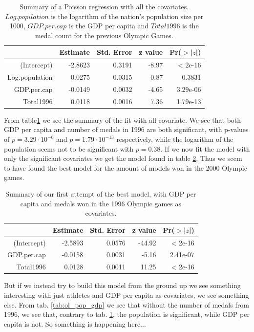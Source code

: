 \documentclass[a4paper,norsk, 10pt]{article}
\begin{document}
\begin{table}[!htb]
\centering
\begin{tabular}{rrrrr}
  \hline
 & Estimate & Std. Error & z value & Pr($>$|$z$|) \\ 
  \hline
(Intercept) & -2.8623 & 0.3191 & -8.97 & < 2e-16 \\ 
  Log.population & 0.0275 & 0.0315 & 0.87 & 0.3831 \\ 
  GDP.per.cap & -0.0149 & 0.0032 & -4.65 & 3.29e-06 \\ 
  Total1996 & 0.0118 & 0.0016 & 7.36 & 1.79e-13 \\ 
   \hline
\end{tabular}
\caption{Summary of a Poisson regression with all the covariates. $Log.popilation$ is the logarithm of the nation's population size per 1000, $GDP.per.cap$ is the GDP per capita and $Total1996$ is the medal count for the previous Olympic Games.}\label{tab:ol_full_it}
\end{table}


From table\ref{tab:ol_full_it} we see the summary of the fit with all covariate. We see that both GDP per capita and number of medals in 1996 are both significant, with p-values of $p=3.29\cdot 10^{-6}$ and $p=1.79\cdot 10^{-13}$ respectively, while the logarithm of the population seems not to be significant with $p = 0.38$. If we now fit the model with only the significant covariates we get the model found in table \ref{tab:ol_96_gdp}. Thus we seem to have found the best model for the amount of models won in the 2000 Olympic games. 

\begin{table}[!htb]
\centering
\begin{tabular}{rrrrr}
  \hline
 & Estimate & Std. Error & z value & Pr($>$|$z$|) \\ 
  \hline
(Intercept) & -2.5893 & 0.0576 & -44.92 & < 2e-16 \\ 
  GDP.per.cap & -0.0158 & 0.0031 & -5.16 & 2.41e-07 \\ 
  Total1996 & 0.0128 & 0.0011 & 11.25 & < 2e-16 \\ 
   \hline
\end{tabular}
\caption{Summary of our first attempt of the best model, with GDP per capita and medals won in the 1996 Olympic games as covariates.}\label{tab:ol_96_gdp}
\end{table}

But if we instead try to build this model from the ground up we see something interesting with just athletes and GDP per capita as covariates, we see something else. From tab. \ref{tab:ol_pop_gdp} we see that without the number of medals from 1996, we see that, contrary to tab. \ref{tab:ol_full_it}, the population is significant, while GDP per capita is not. So something is happening here...
\end{document}
